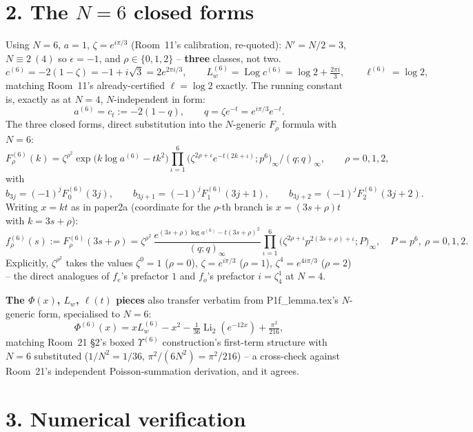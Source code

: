 \documentclass[11pt]{article}
\begin{document}
\section*{2. The $N=6$ closed forms}

Using $N=6$, $a=1$, $\zeta=e^{i\pi/3}$ (Room~11's calibration, re-quoted): $N'=N/2=3$,
$N\equiv2\ (4)$ so $\epsilon=-1$, and $\rho\in\{0,1,2\}$ -- \textbf{three} classes, not two.
\[
  c^{(6)}=-2(1-\zeta)=-1+i\sqrt3=2e^{2\pi i/3},\qquad
  L_w^{(6)}=\operatorname{Log}c^{(6)}=\log2+\tfrac{2\pi i}3,\qquad \ell^{(6)}=\log2,
\]
matching Room~11's already-certified $\ell=\log2$ exactly. The running constant is, exactly as at
$N=4$, $N$-independent in form:
\[
  a^{(6)}=c_t:=-2(1-q),\qquad q=\zeta e^{-t}=e^{i\pi/3}e^{-t}.
\]
The three closed forms, direct substitution into the $N$-generic $F_\rho$ formula with $N=6$:
\[
  F_\rho^{(6)}(k)=\zeta^{\rho^2}\exp\bigl(k\log a^{(6)}-tk^2\bigr)
  \prod_{\iota=1}^6\bigl(\zeta^{2\rho+\iota}e^{-t(2k+\iota)};p^6\bigr)_\infty\Big/(q;q)_\infty,
  \qquad \rho=0,1,2,
\]
with
\[
  b_{3j}=(-1)^jF_0^{(6)}(3j),\qquad b_{3j+1}=(-1)^jF_1^{(6)}(3j+1),\qquad b_{3j+2}=(-1)^jF_2^{(6)}(3j+2).
\]
Writing $x=kt$ as in paper2a (coordinate for the $\rho$-th branch is $x=(3s+\rho)t$ with $k=3s+\rho$):
\[
  \boxed{f_\rho^{(6)}(s):=F_\rho^{(6)}(3s+\rho)=\zeta^{\rho^2}\,
  \frac{e^{(3s+\rho)\log a^{(6)}-t(3s+\rho)^2}}{(q;q)_\infty}
  \prod_{\iota=1}^6\bigl(\zeta^{2\rho+\iota}p^{2(3s+\rho)+\iota};P\bigr)_\infty},\quad P=p^6,\ \rho=0,1,2.
\]
Explicitly, $\zeta^{\rho^2}$ takes the values $\zeta^0=1$ ($\rho=0$), $\zeta=e^{i\pi/3}$ ($\rho=1$),
$\zeta^4=e^{4i\pi/3}$ ($\rho=2$) -- the direct analogues of $f_e$'s prefactor $1$ and $f_o$'s
prefactor $i=\zeta_4^1$ at $N=4$.

\textbf{The $\Phi(x)$, $L_w$, $\ell(t)$ pieces} also transfer verbatim from P1f\_lemma.tex's
$N$-generic form, specialised to $N=6$:
\[
  \Phi^{(6)}(x)=xL_w^{(6)}-x^2-\tfrac1{36}\operatorname{Li}_2(e^{-12x})+\tfrac{\pi^2}{216},
\]
matching Room~21 \S2's boxed $\Upsilon^{(6)}$ construction's first-term structure with $N=6$
substituted ($1/N^2=1/36$, $\pi^2/(6N^2)=\pi^2/216$) -- a cross-check against Room~21's independent
Poisson-summation derivation, and it agrees.

\section*{3. Numerical verification}
\end{document}
